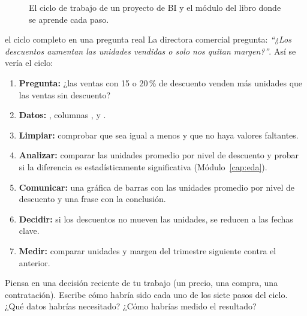 \begin{figure}[H]
\caption{El ciclo de trabajo de un proyecto de BI y el módulo del libro
donde se aprende cada paso.}
\label{fig:m0-ciclo}
\end{figure}

\begin{ejemplo}{el ciclo completo en una pregunta real}
La directora comercial pregunta: \textit{``¿Los descuentos aumentan las
unidades vendidas o solo nos quitan margen?''}. Así se vería el ciclo:
\begin{enumerate}
  \item \textbf{Pregunta:} ¿las ventas con 15 o 20\,\% de descuento venden
        más unidades que las ventas sin descuento?
  \item \textbf{Datos:} , columnas
        ,  y .
  \item \textbf{Limpiar:} comprobar que  sea igual a
         menos  y que no haya
        valores faltantes.
  \item \textbf{Analizar:} comparar las unidades promedio por nivel de
        descuento y probar si la diferencia es estadísticamente
        significativa (Módulo~\ref{cap:eda}).
  \item \textbf{Comunicar:} una gráfica de barras con las unidades
        promedio por nivel de descuento y una frase con la conclusión.
  \item \textbf{Decidir:} si los descuentos no mueven las unidades, se
        reducen a las fechas clave.
  \item \textbf{Medir:} comparar unidades y margen del trimestre siguiente
        contra el anterior.
\end{enumerate}
\end{ejemplo}

\begin{hazlotu}
Piensa en una decisión reciente de tu trabajo (un precio, una compra, una
contratación). Escribe cómo habría sido cada uno de los siete pasos del
ciclo. ¿Qué datos habrías necesitado? ¿Cómo habrías medido el resultado?
\end{hazlotu}

